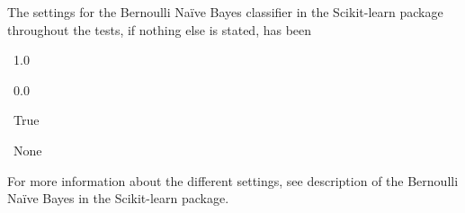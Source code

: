 The settings for the Bernoulli Naïve Bayes classifier in the Scikit-learn package throughout the tests, if nothing else is stated, has been
\begin{description}
	\item[Alpha:] \ 1.0
	\item[Binarize:] \ 0.0
	\item[Fit prior:]\ True
	\item[Class prior:] \ None
\end{description}
For more information about the different settings, see description of the Bernoulli Naïve Bayes in the Scikit-learn package.
